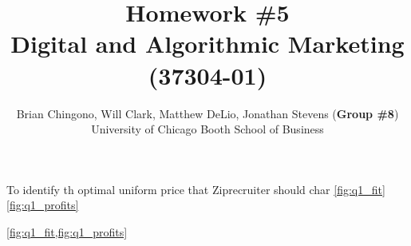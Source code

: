 



\title{Homework \#5\\
Digital and Algorithmic Marketing (37304-01)}
\author{
Brian Chingono, Will Clark, Matthew DeLio, Jonathan Stevens (\textbf{Group \#8})\\
University of Chicago Booth School of Business}

\maketitle

\section{} %

To identify th optimal uniform price that Ziprecruiter should char
\vref{fig:q1_fit} \vref{fig:q1_profits} 

\vref{fig:q1_fit,fig:q1_profits}





\section{} %




\section{} %



% 


